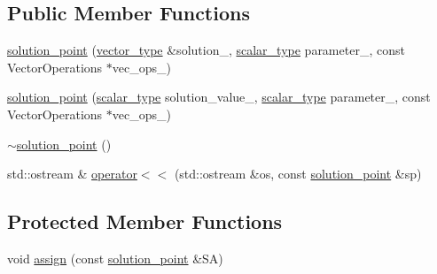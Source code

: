\subsection*{Public Member Functions}
\begin{DoxyCompactItemize}
\item 
\hyperlink{classcontinuation_1_1solution__point_a4b458136d35fc5c2ce1d403f53b9f00a}{solution\-\_\-point} (\hyperlink{classcontinuation_1_1solution__point_a6c3692e61ce44b2ac89223c0f6db2895}{vector\-\_\-type} \&solution\-\_\-, \hyperlink{classcontinuation_1_1solution__point_aa3e601aeccb1c0fd6faebd835f1e92db}{scalar\-\_\-type} parameter\-\_\-, const Vector\-Operations $\ast$vec\-\_\-ops\-\_\-)
\item 
\hyperlink{classcontinuation_1_1solution__point_a096bc86cd5f9ba433b8efd7fda2fffa9}{solution\-\_\-point} (\hyperlink{classcontinuation_1_1solution__point_aa3e601aeccb1c0fd6faebd835f1e92db}{scalar\-\_\-type} solution\-\_\-value\-\_\-, \hyperlink{classcontinuation_1_1solution__point_aa3e601aeccb1c0fd6faebd835f1e92db}{scalar\-\_\-type} parameter\-\_\-, const Vector\-Operations $\ast$vec\-\_\-ops\-\_\-)
\item 
\hyperlink{classcontinuation_1_1solution__point_af2da3e72e5351f801d9d1e480a06d63c}{$\sim$solution\-\_\-point} ()
\item 
std\-::ostream \& \hyperlink{classcontinuation_1_1solution__point_ab8c0a0ac40be6cc8d6a0ca8ecaf60754}{operator$<$$<$} (std\-::ostream \&os, const \hyperlink{classcontinuation_1_1solution__point}{solution\-\_\-point} \&sp)
\end{DoxyCompactItemize}
\subsection*{Protected Member Functions}
\begin{DoxyCompactItemize}
\item 
void \hyperlink{classcontinuation_1_1solution__point_a8ec64f45e9dddd2122546080c26ddfc2}{assign} (const \hyperlink{classcontinuation_1_1solution__point}{solution\-\_\-point} \&S\-A)
\end{DoxyCompactItemize}
